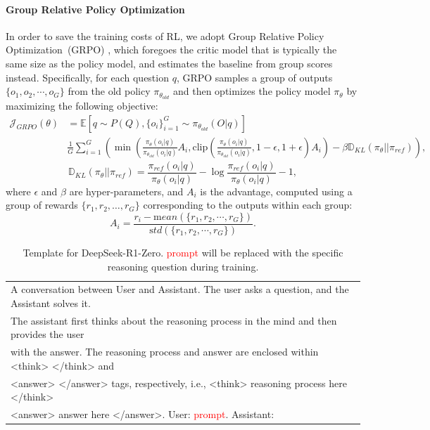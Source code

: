 \documentclass[11pt, a4paper, logo, copyright, nonumbering]{deepseek}
\newcommand{\dsro}{DeepSeek-R1-Zero}
\begin{document}
\paragraph{Group Relative Policy Optimization} In order to save the training costs of RL, we adopt Group Relative Policy Optimization~(GRPO) \citep{deepseekmath}, which foregoes the critic model that is typically the same size as the policy model, and estimates the baseline from group scores instead. 
Specifically, for each question $q$, GRPO samples a group of outputs $\{o_1, o_2, \cdots, o_G\}$ from the old policy $\pi_{\theta_{old}}$ and then optimizes the policy model $\pi_{\theta}$ by maximizing the following objective:
\begin{equation}
\begin{split}
    \mathcal{J}_{GRPO}(\theta) &= \mathbb{E}{[q \sim P(Q), \{o_i\}_{i=1}^G \sim \pi_{\theta_{old}}(O|q)]}  \\
    & \frac{1}{G}\sum_{i=1}^G \left( \min \left( \frac{\pi_\theta(o_i |q)}{\pi_{\theta_{old}}(o_i |q)} A_i, \text{clip} \left( \frac{\pi_\theta(o_i |q)}{\pi_{\theta_{old}}(o_i |q)}, 1 - \epsilon, 1 + \epsilon \right)  A_i \right) - \beta \mathbb{D}_{KL}\left(\pi_{\theta} || \pi_{ref}\right)\right) ,
\end{split}
\label{eq:GRPO-obj}
\end{equation}
\begin{equation}
    \mathbb{D}_{KL}\left(\pi_{\theta} || \pi_{ref}\right) = \frac{\pi_{ref}(o_i|q)}{\pi_{\theta}(o_i|q)}- \log\frac{\pi_{ref}(o_i|q)}{\pi_{\theta}(o_i|q)} - 1,
\end{equation}
where $\epsilon$ and $\beta$ are hyper-parameters, and $A_i$ is the advantage, computed using a group of rewards $\{r_1, r_2, \ldots, r_G\}$ corresponding to the outputs within each group:
\begin{equation}
    A_i = \frac{r_i - {\mathrm mean(\{r_1, r_2, \cdots, r_G\})}}{{\mathrm std(\{r_1, r_2, \cdots, r_G\})}}.
\end{equation}


\begin{table}[t]
    \centering
    \small
    \begin{tabular}{l}
    \toprule
    A conversation between User and Assistant. The user asks a question, and the Assistant solves it. \\
     The assistant first thinks about the reasoning process in the mind and then provides the user \\ with the answer.
     The reasoning process and answer are enclosed within <think> </think> and \\<answer> </answer> tags, respectively, i.e., <think> reasoning process here </think> \\ <answer> answer here </answer>. 
     User: \textcolor{red}{prompt}. Assistant: \\
     \bottomrule
    \end{tabular}
    \caption{Template for \dsro{}. \textcolor{red}{prompt} will be replaced with the specific reasoning question during training.}
    \label{tab:r0_template}
\end{table}
\end{document}
